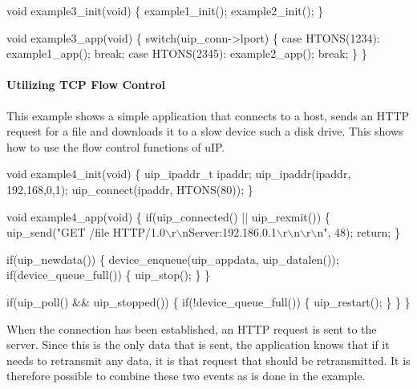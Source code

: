 \begin{DoxyCode}
\textcolor{keywordtype}{void} example3\_init(\textcolor{keywordtype}{void}) \{
   example1\_init();
   example2\_init();   
\}

\textcolor{keywordtype}{void} example3\_app(\textcolor{keywordtype}{void}) \{
   \textcolor{keywordflow}{switch}(uip\_conn->lport) \{
   \textcolor{keywordflow}{case} HTONS(1234):
      example1\_app();
      \textcolor{keywordflow}{break};
   \textcolor{keywordflow}{case} HTONS(2345):
      example2\_app();
      \textcolor{keywordflow}{break};
   \}
\}
\end{DoxyCode}
\hypertarget{a00074_example4}{}\paragraph{Utilizing T\+C\+P Flow Control}\label{a00074_example4}
This example shows a simple application that connects to a host, sends an H\+T\+TP request for a file and downloads it to a slow device such a disk drive. This shows how to use the flow control functions of u\+IP.


\begin{DoxyCode}
\textcolor{keywordtype}{void} example4\_init(\textcolor{keywordtype}{void}) \{
   uip\_ipaddr\_t ipaddr;
   uip\_ipaddr(ipaddr, 192,168,0,1);
   uip\_connect(ipaddr, HTONS(80));
\}

\textcolor{keywordtype}{void} example4\_app(\textcolor{keywordtype}{void}) \{
   \textcolor{keywordflow}{if}(uip\_connected() || uip\_rexmit()) \{
      uip\_send(\textcolor{stringliteral}{"GET /file HTTP/1.0\(\backslash\)r\(\backslash\)nServer:192.186.0.1\(\backslash\)r\(\backslash\)n\(\backslash\)r\(\backslash\)n"},
               48);
      \textcolor{keywordflow}{return};
   \}

   \textcolor{keywordflow}{if}(uip\_newdata()) \{
      device\_enqueue(uip\_appdata, uip\_datalen());
      \textcolor{keywordflow}{if}(device\_queue\_full()) \{
         uip\_stop();
      \}
   \}

   \textcolor{keywordflow}{if}(uip\_poll() && uip\_stopped()) \{
      \textcolor{keywordflow}{if}(!device\_queue\_full()) \{
         uip\_restart();
      \}
   \}
\}
\end{DoxyCode}


When the connection has been established, an H\+T\+TP request is sent to the server. Since this is the only data that is sent, the application knows that if it needs to retransmit any data, it is that request that should be retransmitted. It is therefore possible to combine these two events as is done in the example.

